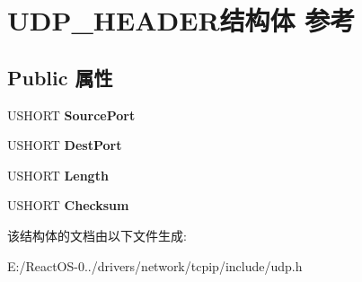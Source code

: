 \hypertarget{struct_u_d_p___h_e_a_d_e_r}{}\section{U\+D\+P\+\_\+\+H\+E\+A\+D\+E\+R结构体 参考}
\label{struct_u_d_p___h_e_a_d_e_r}
\subsection*{Public 属性}
\begin{DoxyCompactItemize}
\item 
\mbox{\label{struct_u_d_p___h_e_a_d_e_r_a80160398260ff12e506d708f433e5ade}} 
U\+S\+H\+O\+RT {\bfseries Source\+Port}
\item 
\mbox{\label{struct_u_d_p___h_e_a_d_e_r_a583541b647d0952abaec5f04b283dd3d}} 
U\+S\+H\+O\+RT {\bfseries Dest\+Port}
\item 
\mbox{\label{struct_u_d_p___h_e_a_d_e_r_a98d84dbe7fa9e41c5608c34695e64766}} 
U\+S\+H\+O\+RT {\bfseries Length}
\item 
\mbox{\label{struct_u_d_p___h_e_a_d_e_r_a33635381031771580b110d895bcd7bd0}} 
U\+S\+H\+O\+RT {\bfseries Checksum}
\end{DoxyCompactItemize}


该结构体的文档由以下文件生成\+:\begin{DoxyCompactItemize}
\item 
E\+:/\+React\+O\+S-\/0../drivers/network/tcpip/include/udp.\+h\end{DoxyCompactItemize}
